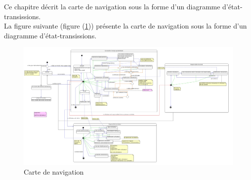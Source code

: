 
Ce chapitre décrit la carte de navigation sous la forme d'un diagramme d'état-transissions. \\

La figure suivante (figure (\ref{carteDeNavigation})) présente la carte de navigation sous la forme d'un diagramme d'état-transissions.

\begin{figure}
	\centering
	\includegraphics[scale=0.31, angle=90]{images/diagrammeEtatsTransitions/carteDeNavigation.png}
	\caption{Carte de navigation}
	\label{carteDeNavigation}
\end{figure}